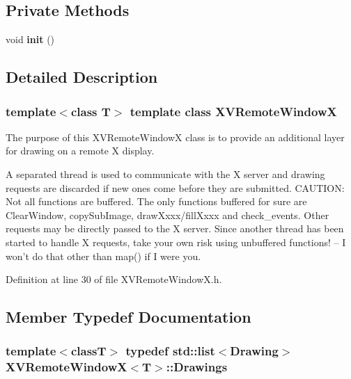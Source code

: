 \subsection*{Private Methods}
\begin{CompactItemize}
\item 
\label{XVRemoteWindowX_c0}
\hypertarget{class_XVRemoteWindowX_c0}{
void {\bf init} ()}

\end{CompactItemize}


\subsection{Detailed Description}
\subsubsection*{template$<$class T$>$  template class XVRemote\-Window\-X}

The purpose of this XVRemote\-Window\-X class is to provide an additional layer for drawing on a remote X display.

A separated thread is used to communicate with the X server and drawing requests are discarded if new ones come before they are submitted. CAUTION: Not all functions are buffered. The only functions buffered for sure are Clear\-Window, copy\-Sub\-Image, draw\-Xxxx/fill\-Xxxx and check\_\-events.  Other requests may be directly passed to the X server. Since another  thread has been started to handle X requests, take your own risk using  unbuffered functions! -- I won't do that other than map() if I were you. 



Definition at line 30 of file XVRemote\-Window\-X.h.

\subsection{Member Typedef Documentation}
\label{XVRemoteWindowX_t0}
\hypertarget{class_XVRemoteWindowX_t0}{
\subsubsection[Drawings]{\setlength{\rightskip}{0pt plus 5cm}template$<$classT$>$ typedef std::list$<$Drawing$>$ XVRemote\-Window\-X$<$T$>$::Drawings}}




